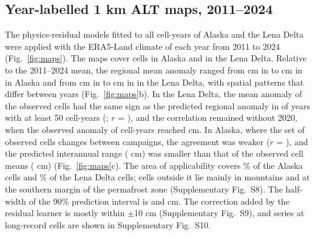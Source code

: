 \subsection{Year-labelled 1 km ALT maps, 2011--2024}
The physics-residual models fitted to all cell-years of Alaska and the Lena Delta were applied with the ERA5-Land climate of each year from 2011 to 2024 (Fig.~\ref{fig:maps}). The maps cover \nncellmapAk{} cells in Alaska and \nncellmapLe{} in the Lena Delta. Relative to the 2011--2024 mean, the regional mean anomaly ranged from \nanminAk{} cm in \nanminyrAk{} to \nanmaxAk{} cm in \nanmaxyrAk{} in Alaska and from \nanminLe{} cm in \nanminyrLe{} to \nanmaxLe{} cm in \nanmaxyrLe{} in the Lena Delta, with spatial patterns that differ between years (Fig.~\ref{fig:maps}b). In the Lena Delta, the mean anomaly of the observed cells had the same sign as the predicted regional anomaly in \nanobssameLe{} of \nanobsnLe{} years with at least 50 cell-years (\nanobsyrsLe; $r$ = \nanobsrLe), and the correlation remained \nanobsrLeNoTwenty{} without 2020, when the observed anomaly of \nanobsLeTwentyN{} cell-years reached \nanobsLeTwentyObs{} cm. In Alaska, where the set of observed cells changes between campaigns, the agreement was weaker ($r$ = \nanobsrAk), and the predicted interannual range (\nanpredrangeAk{} cm) was smaller than that of the observed cell means (\nanobsrangeAk{} cm) (Fig.~\ref{fig:maps}c). The area of applicability covers \naoaAk\% of the Alaska cells and \naoaLe\% of the Lena Delta cells; cells outside it lie mainly in mountains and at the southern margin of the permafrost zone (Supplementary Fig.~S8). The half-width of the 90\% prediction interval is \nhwAk{} and \nhwLe{} cm. The correction added by the residual learner is mostly within $\pm$10 cm (Supplementary Fig.~S9), and series at long-record cells are shown in Supplementary Fig.~S10.

